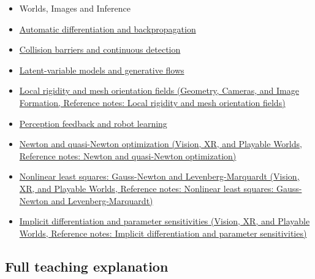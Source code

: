 \begin{itemize}
\item
  {Worlds, Images and Inference}
\item
  \hyperref[appendix-40df0855b4a7]{Automatic differentiation and backpropagation}
\item
  \hyperref[appendix-a9ba01fa72a6]{Collision barriers and continuous detection}
\item
  \hyperref[appendix-2c568f05ee34]{Latent-variable models and generative flows}
\item
  \href{../03-Geometry-Cameras-and-Image-Formation/main.pdf\#nameddest=appendix-7107009c505b}{Local rigidity and mesh orientation fields (Geometry, Cameras, and Image Formation, Reference notes: Local rigidity and mesh orientation fields)}
\item
  \hyperref[appendix-b0c42da325f1]{Perception feedback and robot learning}
\item
  \href{../07-Vision-XR-and-Playable-Worlds/main.pdf\#nameddest=appendix-54c8f5828387}{Newton and quasi-Newton optimization (Vision, XR, and Playable Worlds, Reference notes: Newton and quasi-Newton optimization)}
\item
  \href{../07-Vision-XR-and-Playable-Worlds/main.pdf\#nameddest=appendix-2c2df8345991}{Nonlinear least squares: Gauss-Newton and Levenberg-Marquardt (Vision, XR, and Playable Worlds, Reference notes: Nonlinear least squares: Gauss-Newton and Levenberg-Marquardt)}
\item
  \href{../07-Vision-XR-and-Playable-Worlds/main.pdf\#nameddest=appendix-8836553d56fc}{Implicit differentiation and parameter sensitivities (Vision, XR, and Playable Worlds, Reference notes: Implicit differentiation and parameter sensitivities)}
\end{itemize}

\subsection{Full teaching explanation}\label{appendix-29f4bea4c2bb-full-teaching-explanation}

\hypertarget{appendix-29f4bea4c2bb-full-teaching-explanation}{}

